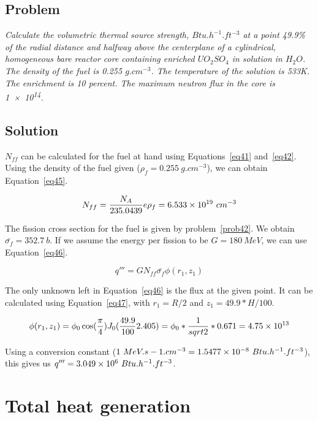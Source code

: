 \subsection{Problem}
\textit{Calculate the volumetric thermal source strength, $Btu.h^{-1}.ft^{-3}$ at a point 49.9\% of the radial distance and halfway above the centerplane of a cylindrical, homogeneous bare reactor core containing enriched $UO_2SO_4$ in solution in $H_2O$. The density of the fuel is 0.255 $g.cm^{-3}$. The temperature of the solution is 533K. The enrichment is 10 percent. The maximum neutron flux in the core is \num{1e14}.}

\subsection{Solution}

$N_{ff}$ can be calculated for the fuel at hand using Equations~\ref{eq41} and~\ref{eq42}. Using the density of the fuel given ($\rho_f = 0.255\ g.cm^{-3}$), we can obtain Equation~\ref{eq45}.

\begin{equation}\label{eq45}
N_{ff} = \frac{N_A}{235.0439}e\rho_{f} = \text{\num{6.533e19}}\ cm^{-3}
\end{equation}

The fission cross section for the fuel is given by problem~\ref{prob42}. We obtain $\bar{\sigma_{f}} = 352.7\ b$. If we assume the energy per fission to be $G = 180\ MeV$, we can use Equation~\ref{eq46}.

\begin{equation}\label{eq46}
q''' = G N_{ff} \bar{\sigma_{f}} \phi(r_1, z_1)
\end{equation}

The only unknown left in Equation~\ref{eq46} is the flux at the given point. It can be calculated using Equation~\ref{eq47}, with $r_1 = R/2$ and $z_1 = 49.9*H/100$.

\begin{equation}\label{eq47}
\phi(r_1, z_1) = \phi_0 \cos(\frac{\pi}{4}) J_0(\frac{49.9}{100}2.405) = \phi_0 * \frac{1}{sqrt{2}} * 0.671 = \text{\num{4.75e13}}
\end{equation}

Using a conversion constant ($1\ MeV.s-1.cm^{-3} = \text{\num{1.5477e-8}}\ Btu.h^{-1}.ft^{-3}$), this gives us $q''' = \text{\num{3.049e6}}\ Btu.h^{-1}.ft^{-3}$.



\section{Total heat generation}
\label{prob44}

